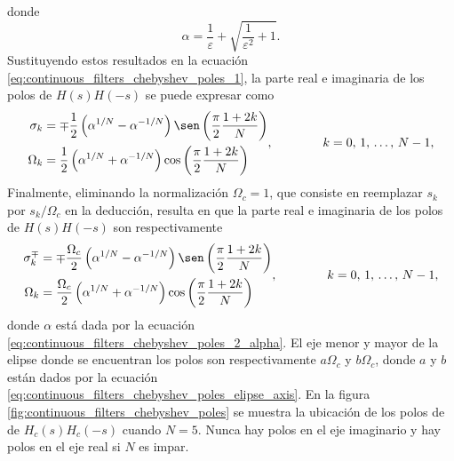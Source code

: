 \documentclass[a4paper]{report}
\begin{document}
donde 
\begin{equation}\label{eq:continuous_filters_chebyshev_poles_2_alpha}
 \alpha=\frac{1}{\varepsilon}+\sqrt{\frac{1}{\varepsilon^2}+1}. 
\end{equation}
Sustituyendo estos resultados en la ecuación \ref{eq:continuous_filters_chebyshev_poles_1}, la parte real e imaginaria de los polos de \(H(s)H(-s)\) se puede expresar como
\[
 \begin{aligned}
  \sigma_k&=\mp\frac{1}{2}\left(\alpha^{1/N}-\alpha^{-1/N}\right)\sen\left(\frac{\pi}{2}\frac{1+2k}{N}\right)\\
  \Omega_k&=\frac{1}{2}\left(\alpha^{1/N}+\alpha^{-1/N}\right)\cos\left(\frac{\pi}{2}\frac{1+2k}{N}\right)
 \end{aligned},
 \qquad\qquad 
 k=0,\,1,\,\dots,\,N-1,
\]
Finalmente, eliminando la normalización \(\Omega_c=1\), que consiste en reemplazar \(s_k\) por \(s_k/\Omega_c\) en la deducción, resulta en que la parte real e imaginaria de los polos de \(H(s)H(-s)\) son respectivamente
\begin{equation}\label{eq:continuous_filters_chebyshev_poles_2}
 \begin{aligned}
  \sigma_k^{\mp}&=\mp\frac{\Omega_c}{2}\left(\alpha^{1/N}-\alpha^{-1/N}\right)\sen\left(\frac{\pi}{2}\frac{1+2k}{N}\right)\\
  \Omega_k&=\frac{\Omega_c}{2}\left(\alpha^{1/N}+\alpha^{-1/N}\right)\cos\left(\frac{\pi}{2}\frac{1+2k}{N}\right)
 \end{aligned},
 \qquad\qquad 
 k=0,\,1,\,\dots,\,N-1,
\end{equation}
donde \(\alpha\) está dada por la ecuación \ref{eq:continuous_filters_chebyshev_poles_2_alpha}. El eje menor y mayor de la elipse donde se encuentran los polos son respectivamente \(a\Omega_c\) y \(b\Omega_c\), donde \(a\) y \(b\) están dados por la ecuación \ref{eq:continuous_filters_chebyshev_poles_elipse_axis}. En la figura \ref{fig:continuous_filters_chebyshev_poles} se muestra la ubicación de los polos de de \(H_c(s)H_c(-s)\) cuando \(N=5\). Nunca hay polos en el eje imaginario y hay polos en el eje real si \(N\) es impar. 
\end{document}
